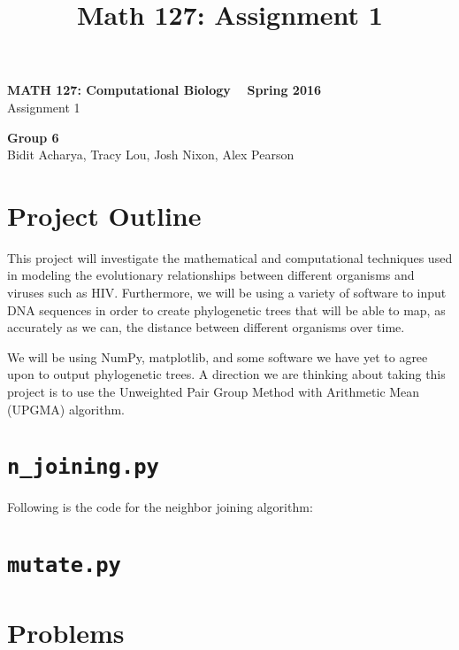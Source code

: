 \documentclass[11pt]{article}
\title{Math 127: Assignment 1}
\theoremstyle{definition}\newtheorem*{problem}{Problem}
\theoremstyle{remark}\newtheorem{claim}{Claim}
\theoremstyle{remark}\newtheorem*{sol}{Solution}
\begin{document}
\begin{center} {\Large \bf MATH 127: Computational Biology ~ Spring 2016 } \\
                [8pt]{Assignment 1\\ [8pt]}\end{center}
                
                \begin{center} \textbf{Group 6}\\ Bidit Acharya, Tracy Lou, Josh Nixon, Alex Pearson
                \end{center}
\section{Project Outline}
This project will investigate the mathematical and computational techniques used in modeling the evolutionary relationships between different organisms and viruses such as HIV. Furthermore, we will be using a variety of software to input DNA sequences in order to create phylogenetic trees that will be able to map, as accurately as we can, the distance between different organisms over time.

We will be using NumPy, matplotlib, and some software we have yet to agree upon to output phylogenetic trees. A direction we are thinking about taking this project is to use the Unweighted Pair Group Method with Arithmetic Mean (UPGMA) algorithm. 

\section{\texttt {n\_joining.py}}
Following is the code for the neighbor joining algorithm:


\section{\texttt {mutate.py}}

\section{Problems}
\end{document}
